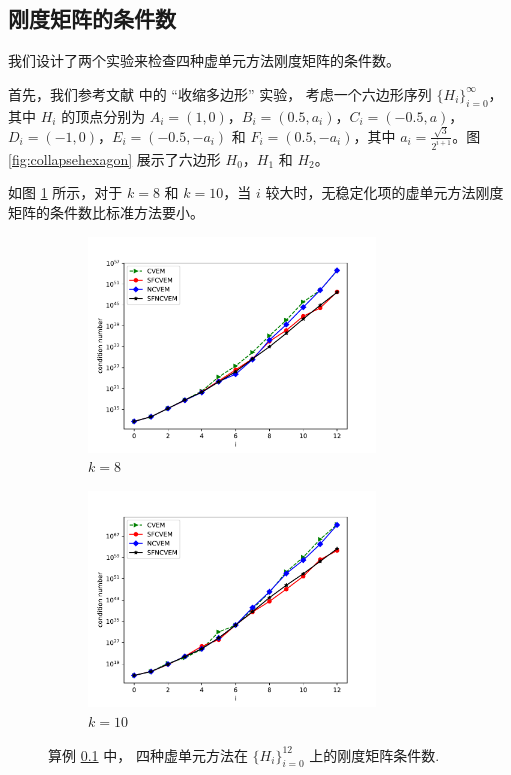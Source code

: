 \subsection{刚度矩阵的条件数}
\label{sec:conditionnumber}
我们设计了两个实验来检查四种虚单元方法刚度矩阵的条件数。

首先，我们参考文献 \cite{Mascotto2018} 中的 “收缩多边形” 实验，
考虑一个六边形序列 $\{H_i\}_{i=0}^{\infty}$，其中 $H_i$ 
的顶点分别为 $A_i = (1, 0)$，$B_i = (0.5, a_i)$，$C_i = (-0.5, a)$，$D_i = (-1,
0)$，$E_i = (-0.5, -a_i)$ 和 $F_i = (0.5, -a_i)$，其中 $a_i =
\frac{\sqrt{3}}{2^{i+1}}$。图 \ref{fig:collapsehexagon} 展示了六边形
$H_0$，$H_1$ 和 $H_2$。

如图 \ref{fig:collapsehexagon_conditionnumber} 所示，对于 $k=8$ 和 $k=10$，当
$i$ 较大时，无稳定化项的虚单元方法刚度矩阵的条件数比标准方法要小。

\begin{figure}[htbp]
\centering
\begin{subfigure}[t]{0.45\linewidth}
\centering
\includegraphics*[width=3in]{./figures/stabfree/collapsing_condition_number_8.pdf}
\caption{$k = 8$}
\end{subfigure}%
\quad \quad
\begin{subfigure}[t]{0.45\linewidth}
\centering
\includegraphics*[width=3in]{./figures/stabfree/collapsing_condition_number_10.pdf}
\caption{$k = 10$}
\end{subfigure}
\caption{算例 \ref{sec:conditionnumber} 中，
四种虚单元方法在 $\{H_i\}_{i=0}^{12}$ 上的刚度矩阵条件数.}
\label{fig:collapsehexagon_conditionnumber}
\end{figure}

